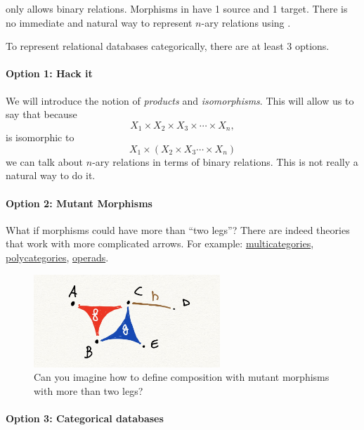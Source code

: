 \Rel only allows binary relations. Morphisms in \Rel have 1 source and 1 target. There is no immediate and natural way to represent $n$-ary relations using \Rel.

To represent relational databases categorically, there are at least 3 options.

\paragraph{Option 1: Hack it}
We will introduce the notion of \emph{products} and \emph{isomorphisms}.
This will allow us to say that because
\begin{equation*}
  X_1 \times X_2 \times X_3 \times \cdots \times X_n,
\end{equation*}
is isomorphic to
\begin{equation*}
  X_1 \times ( X_2 \times X_3 \cdots \times X_n)
\end{equation*}
we can talk about $n$-ary relations in terms of binary relations.
This is not really a natural way to do it.

\paragraph{Option 2: Mutant Morphisms}
What if morphisms could have more than ``two legs''? There
are indeed theories that work with more complicated arrows.
For example: \href{https://ncatlab.org/nlab/show/multicategory}{multicategories}, \href{https://ncatlab.org/nlab/show/polycategory}{polycategories}, \href{https://ncatlab.org/nlab/show/operad}{operads}.

\begin{figure}[h]
  \centering
  \includegraphics[width=7cm]{mutants}
  \caption{Can you imagine how to define
  composition with mutant morphisms
  with more than two legs?}
\end{figure}

\paragraph{Option 3: Categorical databases}

